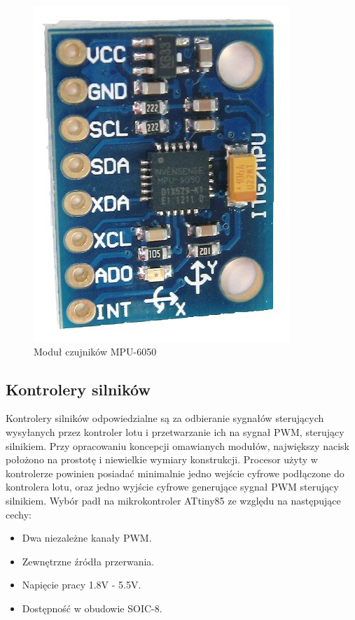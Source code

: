 \begin{figure}[H]
	\centering
	\includegraphics[scale=0.6]{Pictures/mpu-6050.jpg}
		\caption[Moduł czujników MPU-6050]{Moduł czujników MPU-6050}
	\label{fig:mpu-6050}
\end{figure}

\subsection{Kontrolery silników}
Kontrolery silników odpowiedzialne są za odbieranie sygnałów sterujących wysyłanych przez kontroler lotu i przetwarzanie ich na sygnał PWM, sterujący silnikiem. Przy opracowaniu koncepcji omawianych modułów, największy nacisk położono na prostotę i niewielkie wymiary konstrukcji. Procesor użyty w kontrolerze powinien posiadać minimalnie jedno wejście cyfrowe podłączone do kontrolera lotu, oraz jedno wyjście cyfrowe generujące sygnał PWM sterujący silnikiem. Wybór padł na mikrokontroler ATtiny85 ze względu na następujące cechy:

\begin{itemize}
	\item Dwa niezależne kanały PWM.
	\item Zewnętrzne źródła przerwania.
	\item Napięcie pracy 1.8V - 5.5V.
	\item Dostępność w obudowie SOIC-8.
\end{itemize}

